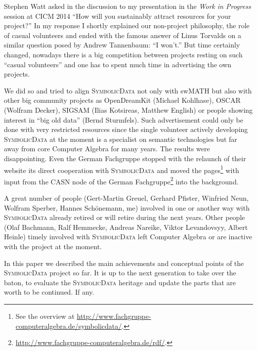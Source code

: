 \documentclass[a4paper,11pt]{article}
\def\SD{\textsc{SymbolicData}}
\begin{document}
Stephen Watt asked in the discussion to my presentation in the \emph{Work in
  Progress} session at CICM 2014 ``How will you sustainably attract resources
for your project?'' In my response I shortly explained our non-project
philosophy, the role of casual volunteers and ended with the famous answer of
Linus Torvalds on a similar question posed by Andrew Tannenbaum: ``I won't.''
But time certainly changed, nowadays there is a big competition between
projects resting on such ``casual volunteers'' and one has to spent much time
in advertising the own projects.

We did so and tried to align {\SD} not only with swMATH but also with other big
community projects as OpenDreamKit (Michael Kohlhase), OSCAR (Wolfram Decker),
SIGSAM (Ilias Kotsireas, Matthew English) or people showing interest in ``big
old data'' (Bernd Sturmfels). Such advertisement could only be done with very
restricted resources since the single volunteer actively developing {\SD} at
the moment is a specialist on semantic technologies but far away from core
Computer Algebra for many years.  The results were disappointing.  Even the
German Fachgruppe stopped with the relaunch of their website its direct
cooperation with {\SD} and moved the pages\footnote{See the overview at
  \url{http://www.fachgruppe-computeralgebra.de/symbolicdata/}.} with input
from the CASN node of the German
Fachgruppe\footnote{\url{http://www.fachgruppe-computeralgebra.de/rdf/}.} into
the background.

A great number of people (Gert-Martin Greuel, Gerhard Pfister, Winfried Neun,
Wolfram Sperber, Hannes Schöne\-mann, me) involved in one or another way with
{\SD} already retired or will retire during the next years.  Other people (Olaf
Bachmann, Ralf Hemmecke, Andreas Nareike, Viktor Levandovsyy, Albert Heinle)
timely involved with {\SD} left Computer Algebra or are inactive with the
project at the moment.

In this paper we described the main achievements and conceptual points of the
{\SD} project so far.  It is up to the next generation to take over the baton,
to evaluate the {\SD} heritage and update the parts that are worth to be
continued. If any.
\end{document}
